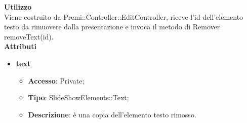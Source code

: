 {{{	\textbf{Utilizzo}\\
		\indent Viene costruito da Premi::Controller::EditController, riceve l’id dell’elemento testo da rimuovere dalla presentazione e invoca il metodo di Remover removeText(id).\\
	\textbf{Attributi}
	\begin{itemize}
		\item \textbf{text}
		\begin{itemize}
			\item \textbf{Accesso}: Private;
			\item \textbf{Tipo}: SlideShowElements::Text;
			\item \textbf{Descrizione}: è una copia dell’elemento testo rimosso. 
		\end{itemize}
	\end{itemize}
	
}}}
